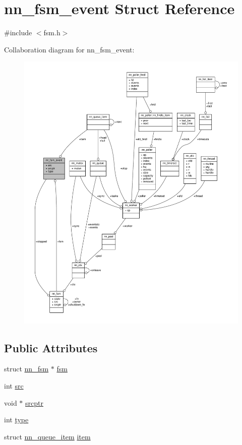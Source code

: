 \hypertarget{structnn__fsm__event}{}\section{nn\+\_\+fsm\+\_\+event Struct Reference}
\label{structnn__fsm__event}


{\ttfamily \#include $<$fsm.\+h$>$}



Collaboration diagram for nn\+\_\+fsm\+\_\+event\+:\nopagebreak
\begin{figure}[H]
\begin{center}
\leavevmode
\includegraphics[width=350pt]{structnn__fsm__event__coll__graph}
\end{center}
\end{figure}
\subsection*{Public Attributes}
\begin{DoxyCompactItemize}
\item 
struct \hyperlink{structnn__fsm}{nn\+\_\+fsm} $\ast$ \hyperlink{structnn__fsm__event_a37e7bb55e85b8c65d08d2c71a5889480}{fsm}
\item 
int \hyperlink{structnn__fsm__event_a6ab6ed4117004772f0b0b1b489365701}{src}
\item 
void $\ast$ \hyperlink{structnn__fsm__event_a3216092753f9eb40385314e622d45350}{srcptr}
\item 
int \hyperlink{structnn__fsm__event_a9836f4659e72960e8959e3d14e2a7196}{type}
\item 
struct \hyperlink{structnn__queue__item}{nn\+\_\+queue\+\_\+item} \hyperlink{structnn__fsm__event_a4f93f7f20c2c966032cbd04b6dc8c49c}{item}
\end{DoxyCompactItemize}


